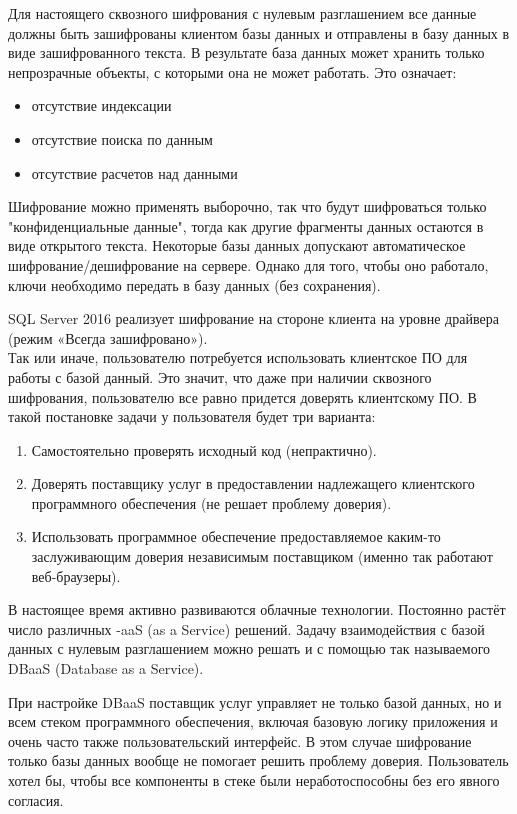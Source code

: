 Для настоящего сквозного шифрования с нулевым разглашением все данные должны быть зашифрованы
клиентом базы данных и отправлены в базу данных в виде зашифрованного текста. В результате база
данных может хранить только непрозрачные объекты, с которыми она не может работать. Это означает:
\begin{itemize}
    \item отсутствие индексации
    \item отсутствие поиска по данным
    \item отсутствие расчетов над данными
\end{itemize}

Шифрование можно применять выборочно, так что будут шифроваться только "конфиденциальные данные", тогда
как другие фрагменты данных остаются в виде открытого текста.
Некоторые базы данных допускают автоматическое шифрование/дешифрование на сервере. Однако
для того, чтобы оно работало, ключи необходимо передать в базу данных (без сохранения).

SQL Server 2016 реализует шифрование на стороне клиента на уровне драйвера (режим «Всегда
зашифровано»). \\

Так или иначе, пользователю потребуется использовать клиентское ПО для работы с базой данный.
Это значит, что даже при наличии сквозного шифрования, пользователю все равно придется доверять
клиентскому ПО. В такой постановке задачи у пользователя будет три варианта:
\begin{enumerate}
    \item Самостоятельно проверять исходный код (непрактично).
    \item Доверять поставщику услуг в предоставлении надлежащего
        клиентского программного обеспечения (не решает проблему доверия).
    \item Использовать программное обеспечение предоставляемое каким-то заслуживающим
        доверия независимым поставщиком (именно так работают веб-браузеры).
\end{enumerate}

В настоящее время активно развиваются облачные технологии. Постоянно растёт число различных -aaS
(as a Service) решений.
Задачу взаимодействия с базой данных с нулевым разглашением можно решать и с помощью так
называемого DBaaS (Database as a Service).

При настройке DBaaS поставщик услуг управляет не только базой данных, но и всем стеком
программного обеспечения, включая базовую логику приложения и очень часто также
пользовательский интерфейс. В этом случае шифрование только базы данных вообще не помогает
решить проблему доверия. Пользователь хотел бы, чтобы все компоненты в стеке были
неработоспособны без его явного согласия.

